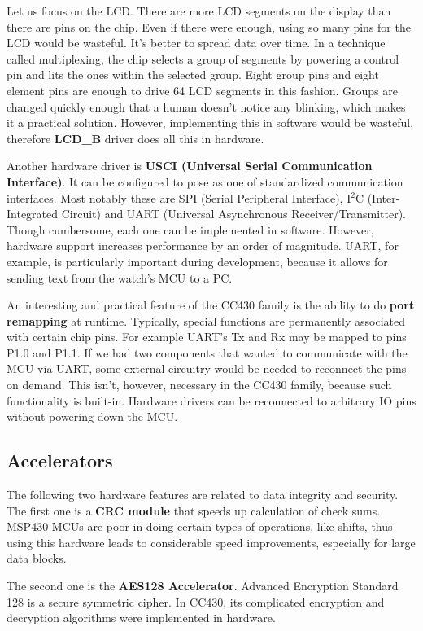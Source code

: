 Let us focus on the LCD. There are more LCD segments on the display
than there are pins on the chip. Even if there were enough, using so
many pins for the LCD would be wasteful. It's better to spread data
over time. In a technique called multiplexing, the chip selects a
group of segments by powering
a control pin and lits the ones within the selected group. Eight group
pins and eight element pins are enough to drive 64 LCD segments in
this fashion. Groups are changed quickly enough that a human doesn't
notice any blinking, which makes it a practical solution.  However,
implementing this in software would be wasteful, therefore {\bf
LCD\_B} driver does all this in hardware.

Another hardware driver is {\bf USCI (Universal Serial
Communication Interface)}. It can be configured to pose as one of
standardized communication interfaces. Most notably these are SPI
(Serial Peripheral Interface), I$^2$C (Inter-Integrated Circuit) and
UART (Universal Asynchronous Receiver/Transmitter). Though cumbersome,
each one can be implemented in software. However, hardware support
increases performance by an order of magnitude. UART, for example, is
particularly important during development, because it allows for sending
text from the watch's MCU to a PC.

An interesting and practical feature of the CC430 family is the
ability to do {\bf port remapping} at runtime. Typically, special
functions are permanently associated with certain chip pins. For example UART's
Tx and Rx may be mapped to pins P1.0 and P1.1. If we had two
components that wanted to communicate with the MCU via UART, some
external circuitry would be needed to reconnect the pins on demand.
This isn't, however, necessary in the CC430 family, because such
functionality is built-in. Hardware drivers can be reconnected to
arbitrary IO pins without powering down the MCU.

\subsection{Accelerators}
The following two hardware features are related to data integrity and
security. The first one is a {\bf CRC module} that speeds up
calculation of check sums.  MSP430 MCUs are poor in doing certain
types of operations, like shifts, thus using this hardware leads to
considerable speed improvements, especially for large data blocks.

The second one is the {\bf AES128 Accelerator}. Advanced Encryption
Standard 128 is a secure symmetric cipher. In CC430, its complicated
encryption and decryption algorithms were implemented in hardware.

